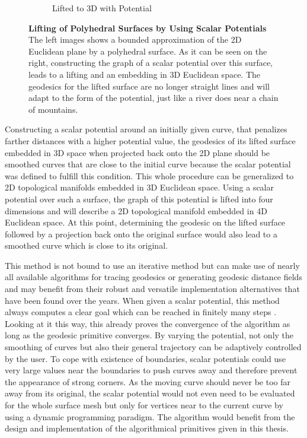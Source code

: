 \documentclass[crop=false]{stdlocal}
\begin{document}
\begin{figure}
\begin{subfigure}[c]{0.4\linewidth}
      \caption{Lifted to 3D with Potential}
      \label{fig:lifting-lifted}
    \end{subfigure}
    \caption[Lifting of Polyhedral Surfaces by Using Scalar Potentials]{%
      \textbf{Lifting of Polyhedral Surfaces by Using Scalar Potentials}\\
      The left images shows a bounded approximation of the 2D Euclidean plane by a polyhedral surface.
      As it can be seen on the right, constructing the graph of a scalar potential over this surface, leads to a lifting and an embedding in 3D Euclidean space.
      The geodesics for the lifted surface are no longer straight lines and will adapt to the form of the potential, just like a river does near a chain of mountains.
    }
    \label{fig:lifting}
  \end{figure}

  Constructing a scalar potential around an initially given curve, that penalizes farther distances with a higher potential value, the geodesics of its lifted surface embedded in 3D space when projected back onto the 2D plane should be smoothed curves that are close to the initial curve because the scalar potential was defined to fulfill this condition.
  This whole procedure can be generalized to 2D topological manifolds embedded in 3D Euclidean space.
  Using a scalar potential over such a surface, the graph of this potential is lifted into four dimensions and will describe a 2D topological manifold embedded in 4D Euclidean space.
  At this point, determining the geodesic on the lifted surface followed by a projection back onto the original surface would also lead to a smoothed curve which is close to its original.

  This method is not bound to use an iterative method but can make use of nearly all available algorithms for tracing geodesics or generating geodesic distance fields and may benefit from their robust and versatile implementation alternatives that have been found over the years.
  When given a scalar potential, this method always computes a clear goal which can be reached in finitely many steps \autocite{mancinelli2022,sharp2020}.
  Looking at it this way, this already proves the convergence of the algorithm as long as the geodesic primitive converges.
  By varying the potential, not only the smoothing of curves but also their general trajectory can be adaptively controlled by the user.
  To cope with existence of boundaries, scalar potentials could use very large values near the boundaries to push curves away and therefore prevent the appearance of strong corners.
  As the moving curve should never be too far away from its original, the scalar potential would not even need to be evaluated for the whole surface mesh but only for vertices near to the current curve by using a dynamic programming paradigm.
  The algorithm would benefit from the design and implementation of the algorithmical primitives given in this thesis.
\end{document}
